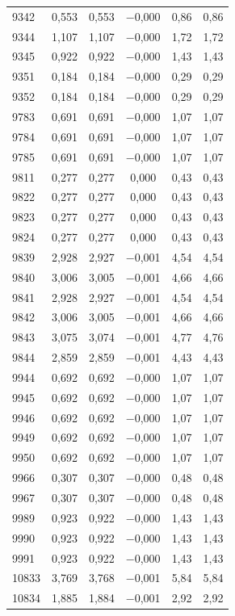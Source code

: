 \begin{longtable}{lccccc}
9342 & 0,553 & 0,553 & $-$0,000 & 0,86 & 0,86 \\
9344 & 1,107 & 1,107 & $-$0,000 & 1,72 & 1,72 \\
9345 & 0,922 & 0,922 & $-$0,000 & 1,43 & 1,43 \\
9351 & 0,184 & 0,184 & $-$0,000 & 0,29 & 0,29 \\
9352 & 0,184 & 0,184 & $-$0,000 & 0,29 & 0,29 \\
9783 & 0,691 & 0,691 & $-$0,000 & 1,07 & 1,07 \\
9784 & 0,691 & 0,691 & $-$0,000 & 1,07 & 1,07 \\
9785 & 0,691 & 0,691 & $-$0,000 & 1,07 & 1,07 \\
9811 & 0,277 & 0,277 & 0,000 & 0,43 & 0,43 \\
9822 & 0,277 & 0,277 & 0,000 & 0,43 & 0,43 \\
9823 & 0,277 & 0,277 & 0,000 & 0,43 & 0,43 \\
9824 & 0,277 & 0,277 & 0,000 & 0,43 & 0,43 \\
9839 & 2,928 & 2,927 & $-$0,001 & 4,54 & 4,54 \\
9840 & 3,006 & 3,005 & $-$0,001 & 4,66 & 4,66 \\
9841 & 2,928 & 2,927 & $-$0,001 & 4,54 & 4,54 \\
9842 & 3,006 & 3,005 & $-$0,001 & 4,66 & 4,66 \\
9843 & 3,075 & 3,074 & $-$0,001 & 4,77 & 4,76 \\
9844 & 2,859 & 2,859 & $-$0,001 & 4,43 & 4,43 \\
9944 & 0,692 & 0,692 & $-$0,000 & 1,07 & 1,07 \\
9945 & 0,692 & 0,692 & $-$0,000 & 1,07 & 1,07 \\
9946 & 0,692 & 0,692 & $-$0,000 & 1,07 & 1,07 \\
9949 & 0,692 & 0,692 & $-$0,000 & 1,07 & 1,07 \\
9950 & 0,692 & 0,692 & $-$0,000 & 1,07 & 1,07 \\
9966 & 0,307 & 0,307 & $-$0,000 & 0,48 & 0,48 \\
9967 & 0,307 & 0,307 & $-$0,000 & 0,48 & 0,48 \\
9989 & 0,923 & 0,922 & $-$0,000 & 1,43 & 1,43 \\
9990 & 0,923 & 0,922 & $-$0,000 & 1,43 & 1,43 \\
9991 & 0,923 & 0,922 & $-$0,000 & 1,43 & 1,43 \\
10833 & 3,769 & 3,768 & $-$0,001 & 5,84 & 5,84 \\
10834 & 1,885 & 1,884 & $-$0,001 & 2,92 & 2,92 \\

\end{longtable}
